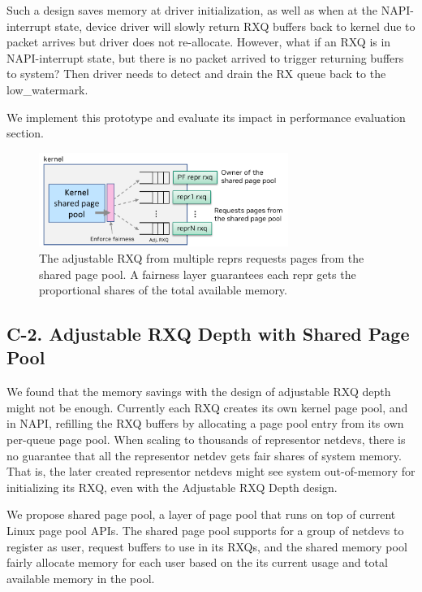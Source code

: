 \documentclass[letterpaper]{article}
\begin{document}
Such a design saves memory at driver initialization, as well as when at
the NAPI-interrupt state, device driver will slowly return RXQ buffers back
to kernel due to packet arrives but driver does not re-allocate.
However, what if an RXQ is in NAPI-interrupt state, but there is no packet
arrived to trigger returning buffers to system? Then driver needs to detect
and drain the RX queue back to the low\_watermark.

We implement this prototype and evaluate its impact in performance evaluation section.

\begin{figure}[t!]
\includegraphics[width=3.2in]{shared_page_pool.pdf}
\centering
\caption{The adjustable RXQ from multiple reprs requests pages from the shared page pool.
A fairness layer guarantees each repr gets the proportional shares of the total available memory.}
\label{fig:shared_page_pool}
\end{figure}

\subsection{C-2. Adjustable RXQ Depth with Shared Page Pool}
We found that the memory savings with the design of adjustable RXQ depth
might not be enough.
Currently each RXQ creates its own kernel page pool, and in NAPI, refilling
the RXQ buffers by allocating a page pool entry from its own per-queue page pool.
When scaling to thousands of representor netdevs, there is no guarantee that
all the representor netdev gets fair shares of system memory. That is, the later
created representor netdevs might see system out-of-memory for initializing its RXQ,
even with the Adjustable RXQ Depth design.

We propose shared page pool, a layer of page pool that runs on top of current
Linux page pool APIs. The shared page pool supports for a group of netdevs
to register as user, request buffers to use in its RXQs, and the shared memory
pool fairly allocate memory for each user based on the its current usage and
total available memory in the pool.
\end{document}
